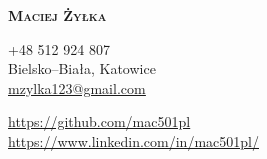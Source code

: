 \documentclass[A4,11pt]{article}
\begin{document}
\textbf{\Huge \scshape{Maciej Żyłka}} \\ \vspace{5pt} 
\begin{minipage}[c]{0.4\textwidth}
    \faPhone \tab +48 512 924 807\\
    \faMapMarker \tab Bielsko--Biała, Katowice\\
    \faEnvelopeO \tab \href{mailto:mzylka123@gmail.com}{\underline{mzylka123@gmail.com}}\\
\end{minipage}
\begin{minipage}[c]{0.4\textwidth}
    \faGithub \tab \href{https://github.com/mac501pl}{\underline{https://github.com/mac501pl}} \\
    \faLinkedinSquare \tab \href{https://www.linkedin.com/in/mac501pl/}{\underline{https://www.linkedin.com/in/mac501pl/}} \\
\end{minipage}
\end{document}
